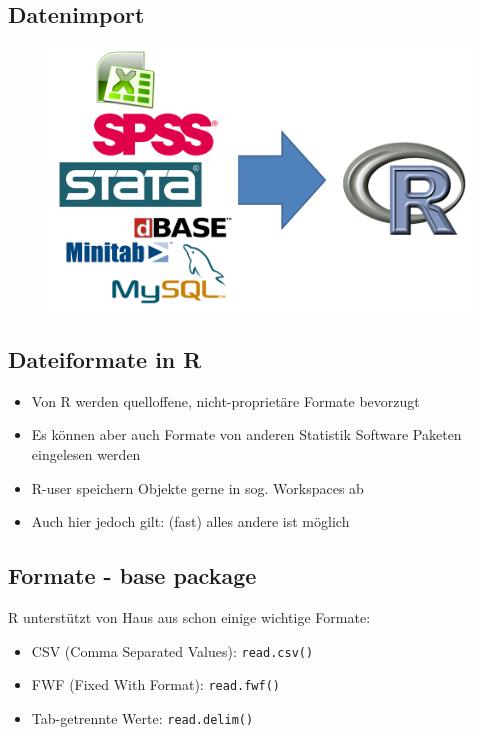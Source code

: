 \documentclass[]{article}
\providecommand{\tightlist}{%
  \setlength{\itemsep}{0pt}\setlength{\parskip}{0pt}}
\begin{document}
\subsection{Datenimport}\label{datenimport-1}

\begin{figure}[htbp]
\centering
\includegraphics{figure/Datenimport.PNG}
\caption{}
\end{figure}

\subsection{Dateiformate in R}\label{dateiformate-in-r}

\begin{itemize}
\tightlist
\item
  Von R werden quelloffene, nicht-proprietäre Formate bevorzugt
\item
  Es können aber auch Formate von anderen Statistik Software Paketen
  eingelesen werden
\item
  R-user speichern Objekte gerne in sog. Workspaces ab
\item
  Auch hier jedoch gilt: (fast) alles andere ist möglich
\end{itemize}

\subsection{Formate - base package}\label{formate---base-package}

R unterstützt von Haus aus schon einige wichtige Formate:

\begin{itemize}
\tightlist
\item
  CSV (Comma Separated Values): \texttt{read.csv()}
\item
  FWF (Fixed With Format): \texttt{read.fwf()}
\item
  Tab-getrennte Werte: \texttt{read.delim()}
\end{itemize}
\end{document}
